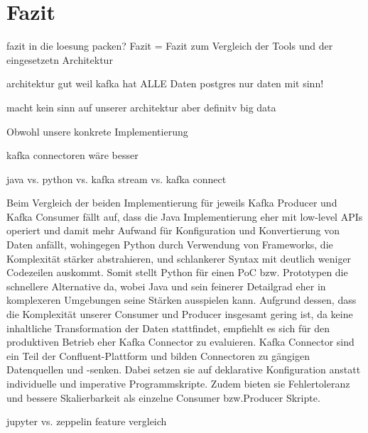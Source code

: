 \chapter{Fazit}
\label{chap:fazit}

fazit in die loesung packen? Fazit = Fazit zum Vergleich der Tools und der eingesetzetn Architektur

architektur gut weil
kafka hat ALLE Daten
postgres nur daten mit sinn!

macht kein sinn auf unserer architektur aber definitv big data


Obwohl unsere konkrete Implementierung 

kafka connectoren wäre besser

java vs. python vs. kafka stream vs. kafka connect

Beim Vergleich der beiden Implementierung für jeweils Kafka Producer und Kafka Consumer fällt auf, dass die Java Implementierung eher mit low-level APIs operiert und damit mehr Aufwand für Konfiguration und Konvertierung von Daten anfällt, wohingegen Python durch Verwendung von Frameworks, die Komplexität stärker abstrahieren, und schlankerer Syntax mit deutlich weniger Codezeilen auskommt. Somit stellt Python für einen PoC bzw. Prototypen die schnellere Alternative da, wobei Java und sein feinerer Detailgrad eher in komplexeren Umgebungen seine Stärken ausspielen kann.\newline
Aufgrund dessen, dass die Komplexität unserer Consumer und Producer insgesamt gering ist, da keine inhaltliche Transformation der Daten stattfindet, empfiehlt es sich für den produktiven Betrieb eher Kafka Connector zu evaluieren. Kafka Connector sind ein  Teil der Confluent-Plattform und bilden Connectoren zu gängigen Datenquellen und -senken. Dabei setzen sie auf deklarative Konfiguration anstatt individuelle und imperative Programmskripte. Zudem bieten sie Fehlertoleranz und bessere Skalierbarkeit als einzelne Consumer bzw.Producer Skripte.


jupyter vs. zeppelin feature vergleich


